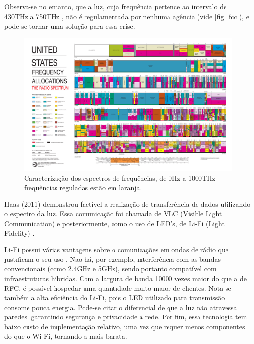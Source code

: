 	Observa-se no entanto, que a luz, cuja frequência pertence ao intervalo de 430THz a 750THz \cite{vision},  não é regulamentada por nenhuma agência (vide \autoref{fig_fcc}), e pode se tornar uma solução para essa crise.

	\begin{figure}[htb]
		\caption{\label{fig_fcc}Caracterização dos espectros de frequências, de 0Hz a 1000THz - frequências reguladas estão em laranja.}
		\begin{center}
	  \includegraphics[width=\textwidth, trim={36.5cm 3.1cm 40cm 61cm},clip]{2003-allochrt.pdf}
			
		\end{center}
	\end{figure}
	
 Haas (2011) demonstrou factível a realização de transferência de dados utilizando o espectro da luz. Essa comunicação foi chamada de VLC (Visible Light Communication) e posteriormente, como o uso de LED's, de Li-Fi (Light Fidelity) \cite{what-is-lifi}. \par 
 
 Li-Fi possui várias vantagens sobre o comunicações em ondas de rádio que justificam o seu uso \cite{comparison-wifi}. Não há, por exemplo, interferência com as bandas convencionais (como 2.4GHz e 5GHz), sendo portanto compatível com infraestruturas híbridas. Com a largura de banda 10000 vezes maior do que a de RFC, é possível hospedar uma quantidade muito maior de clientes. Nota-se também a alta eficiência do Li-Fi, pois o LED utilizado para transmissão consome pouca energia. Pode-se citar o diferencial de que a luz não atravessa paredes, garantindo segurança e privacidade à rede. Por fim, essa tecnologia tem baixo custo de implementação relativo, uma vez que requer menos componentes do que o Wi-Fi, tornando-a mais barata. \par
 
